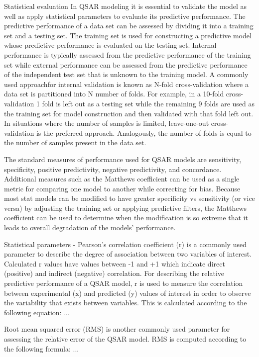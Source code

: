 Statistical evaluation In QSAR modeling it is essential to validate the model as well as apply statistical parameters to evaluate its predictive performance. The predictive performance of a data set can be assessed by dividing it into a training set and a testing set. The training set is used for constructing a predictive model whose predictive performance is evaluated on the testing set. Internal performance is typically assessed from the predictive performance of the training set while external performance can be assessed from the predictive performance of the independent test set that is unknown to the training model. A commonly used approachfor internal validation is known as N-fold cross-validation where a data set is partitioned into N number of folds. For example, in a 10-fold cross-validation 1 fold is left out as a testing set while the remaining 9 folds are used as the training set for model construction and then validated with that fold left out. In situations where the number of samples is limited, leave-one-out cross-validation is the preferred approach. Analogously, the number of folds is equal to the number of samples present in the data set. \cite{Nantasenamat2009}

The standard measures of performance used for QSAR models are sensitivity, specificity, positive predictivity, negative predictivity, and concordance. Additional measures such as the Matthews coefficient can be used as a single metric for comparing one model to another while correcting for bias. Because most stat models can be modified to have greater specificity vs sensitivity (or vice versa) by adjusting the training set or applying predictive filters, the Matthews coefficient can be used to determine when the modification is so extreme that it leads to overall degradation of the models’ performance.\cite{Kruhlak2012}

Statistical parameters - Pearson's correlation coefficient (r) is a commonly used parameter to describe the degree of association between two variables of interest. Calculated r values have values between -1 and +1 which indicate direct (positive) and indirect (negative) correlation. For describing the relative predictive performance of a QSAR model, r is used to measure the correlation between experimental (x) and predicted (y) values of interest in order to observe the variability that exists between variables. This is calculated according to the following equation: ...

Root mean squared error (RMS) is another commonly used parameter for assessing the relative error of the QSAR model. RMS is computed according to the following formula: ...

